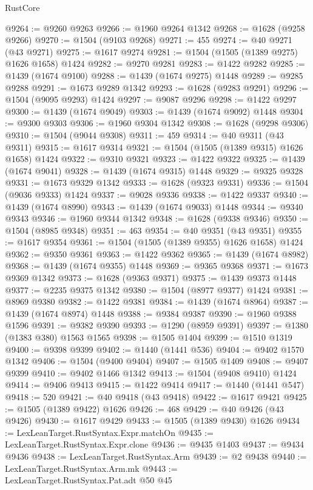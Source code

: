 \begin{lexlean}{RustCore}
\begin{coremodule}
@9264 := @9260 @9263
@9266 := @1960 @9264 @1342
@9268 := @1628 (@9258 @9266)
@9270 := @1504 (@9103 @9268)
@9271 := 455
@9274 := @40 @9271 (@43 @9271)
@9275 := @1617 @9274
@9281 := @1504 (@1505 (@1389 @9275) @1626 @1658) @1424
@9282 := @9270 @9281
@9283 := @1422 @9282
@9285 := @1439 (@1674 @9100)
@9288 := @1439 (@1674 @9275) @1448
@9289 := @9285 @9288
@9291 := @1673 @9289 @1342
@9293 := @1628 (@9283 @9291)
@9296 := @1504 (@9095 @9293) @1424
@9297 := @9087 @9296
@9298 := @1422 @9297
@9300 := @1439 (@1674 @9049)
@9303 := @1439 (@1674 @9092) @1448
@9304 := @9300 @9303
@9306 := @1960 @9304 @1342
@9308 := @1628 (@9298 @9306)
@9310 := @1504 (@9044 @9308)
@9311 := 459
@9314 := @40 @9311 (@43 @9311)
@9315 := @1617 @9314
@9321 := @1504 (@1505 (@1389 @9315) @1626 @1658) @1424
@9322 := @9310 @9321
@9323 := @1422 @9322
@9325 := @1439 (@1674 @9041)
@9328 := @1439 (@1674 @9315) @1448
@9329 := @9325 @9328
@9331 := @1673 @9329 @1342
@9333 := @1628 (@9323 @9331)
@9336 := @1504 (@9036 @9333) @1424
@9337 := @9028 @9336
@9338 := @1422 @9337
@9340 := @1439 (@1674 @8990)
@9343 := @1439 (@1674 @9033) @1448
@9344 := @9340 @9343
@9346 := @1960 @9344 @1342
@9348 := @1628 (@9338 @9346)
@9350 := @1504 (@8985 @9348)
@9351 := 463
@9354 := @40 @9351 (@43 @9351)
@9355 := @1617 @9354
@9361 := @1504 (@1505 (@1389 @9355) @1626 @1658) @1424
@9362 := @9350 @9361
@9363 := @1422 @9362
@9365 := @1439 (@1674 @8982)
@9368 := @1439 (@1674 @9355) @1448
@9369 := @9365 @9368
@9371 := @1673 @9369 @1342
@9373 := @1628 (@9363 @9371)
@9375 := @1439 @9373 @1448
@9377 := @2235 @9375 @1342
@9380 := @1504 (@8977 @9377) @1424
@9381 := @8969 @9380
@9382 := @1422 @9381
@9384 := @1439 (@1674 @8964)
@9387 := @1439 (@1674 @8974) @1448
@9388 := @9384 @9387
@9390 := @1960 @9388 @1596
@9391 := @9382 @9390
@9393 := @1290 (@8959 @9391)
@9397 := @1380 (@1383 @380) @1563 @1565
@9398 := @1505 @1404
@9399 := @1510 @1319
@9400 := @9398 @9399
@9402 := @1440 (@1441 @536)
@9404 := @9402 @1570 @1342
@9406 := @1504 (@9400 @9404)
@9407 := @1505 @1409
@9408 := @9407 @9399
@9410 := @9402 @1466 @1342
@9413 := @1504 (@9408 @9410) @1424
@9414 := @9406 @9413
@9415 := @1422 @9414
@9417 := @1440 (@1441 @547)
@9418 := 520
@9421 := @40 @9418 (@43 @9418)
@9422 := @1617 @9421
@9425 := @1505 (@1389 @9422) @1626
@9426 := 468
@9429 := @40 @9426 (@43 @9426)
@9430 := @1617 @9429
@9433 := @1505 (@1389 @9430) @1626
@9434 := LexLeanTarget.RustSyntax.Expr.matchOn
@9435 := LexLeanTarget.RustSyntax.Expr.clone
@9436 := @9435 @1403
@9437 := @9434 @9436
@9438 := LexLeanTarget.RustSyntax.Arm
@9439 := @2 @9438
@9440 := LexLeanTarget.RustSyntax.Arm.mk
@9443 := LexLeanTarget.RustSyntax.Pat.adt @50 @45

\end{coremodule}
\end{lexlean}
